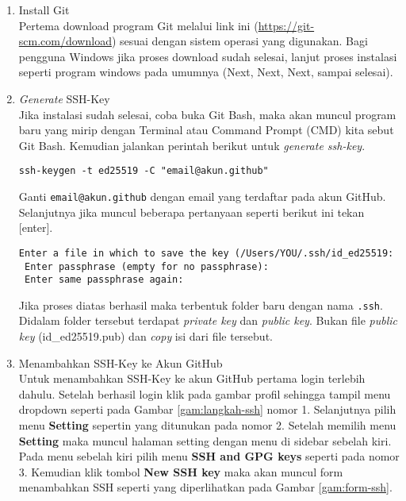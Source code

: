 \documentclass[a4paper]{tufte-handout}
\begin{document}
\begin{enumerate}
\item Install Git \\
Pertema download program Git melalui link ini (\url{https://git-scm.com/download}) sesuai dengan sistem operasi yang digunakan. Bagi pengguna Windows jika proses download sudah selesai, lanjut proses instalasi seperti program windows pada umumnya (Next, Next, Next, sampai selesai).

\item \textit{Generate} SSH-Key \\
Jika instalasi sudah selesai, coba buka Git Bash, maka akan muncul program baru yang mirip dengan Terminal atau Command Prompt (CMD) kita sebut Git Bash. Kemudian jalankan perintah berikut untuk \textit{generate ssh-key}.

\begin{lstlisting}[language=Terminal]
 ssh-keygen -t ed25519 -C "email@akun.github"
\end{lstlisting}

Ganti {\tt email@akun.github} dengan email yang terdaftar pada akun GitHub. Selanjutnya jika muncul beberapa pertanyaan seperti berikut ini tekan [enter].

\begin{lstlisting}[language=Terminal]
 Enter a file in which to save the key (/Users/YOU/.ssh/id_ed25519:
 Enter passphrase (empty for no passphrase):
 Enter same passphrase again:
\end{lstlisting}

Jika proses diatas berhasil maka terbentuk folder baru dengan nama {\tt .ssh}. Didalam folder tersebut terdapat \textit{private key} dan \textit{public key}. Bukan file \textit{public key} (id\_ed25519.pub) dan \textit{copy} isi dari file tersebut.

\item Menambahkan SSH-Key ke Akun GitHub \\
Untuk menambahkan SSH-Key ke akun GitHub pertama login terlebih dahulu. Setelah berhasil login klik pada gambar profil sehingga tampil menu dropdown seperti pada Gambar \ref{gam:langkah-ssh} nomor 1. Selanjutnya pilih menu \textbf{Setting} sepertin yang ditunukan pada nomor 2. Setelah memilih menu \textbf{Setting} maka muncul halaman setting dengan menu di sidebar sebelah kiri. Pada menu sebelah kiri pilih menu \textbf{SSH and GPG keys} seperti pada nomor 3. Kemudian klik tombol \textbf{New SSH key} maka akan muncul form menambahkan SSH seperti yang diperlihatkan pada Gambar \ref{gam:form-ssh}.


\end{enumerate}
\end{document}
